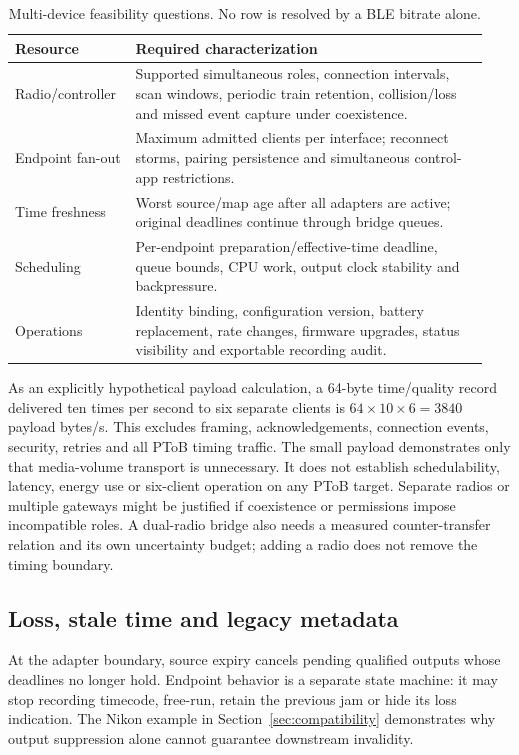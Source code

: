 \documentclass[11pt,letterpaper]{article}
\begin{document}
\begin{table}[htbp]\centering\small
\caption{Multi-device feasibility questions. No row is resolved by a BLE bitrate alone.}\label{tab:capacity}
\begin{tabular}{@{}L{0.23\linewidth}L{0.71\linewidth}@{}}\toprule
Resource & Required characterization\\\midrule
Radio/controller & Supported simultaneous roles, connection intervals, scan windows, periodic train retention, collision/loss and missed event capture under coexistence.\\\addlinespace
Endpoint fan-out & Maximum admitted clients per interface; reconnect storms, pairing persistence and simultaneous control-app restrictions.\\\addlinespace
Time freshness & Worst source/map age after all adapters are active; original deadlines continue through bridge queues.\\\addlinespace
Scheduling & Per-endpoint preparation/effective-time deadline, queue bounds, CPU work, output clock stability and backpressure.\\\addlinespace
Operations & Identity binding, configuration version, battery replacement, rate changes, firmware upgrades, status visibility and exportable recording audit.\\\bottomrule
\end{tabular}
\end{table}

As an explicitly hypothetical payload calculation, a 64-byte time/quality record delivered ten times per second to six separate clients is $64\times10\times6=3840$ payload bytes/s. This excludes framing, acknowledgements, connection events, security, retries and all PToB timing traffic. The small payload demonstrates only that media-volume transport is unnecessary. It does not establish schedulability, latency, energy use or six-client operation on any PToB target. Separate radios or multiple gateways might be justified if coexistence or permissions impose incompatible roles. A dual-radio bridge also needs a measured counter-transfer relation and its own uncertainty budget; adding a radio does not remove the timing boundary.

\subsection{Loss, stale time and legacy metadata}
At the adapter boundary, source expiry cancels pending qualified outputs whose deadlines no longer hold. Endpoint behavior is a separate state machine: it may stop recording timecode, free-run, retain the previous jam or hide its loss indication. The Nikon example in Section~\ref{sec:compatibility} demonstrates why output suppression alone cannot guarantee downstream invalidity.
\end{document}
